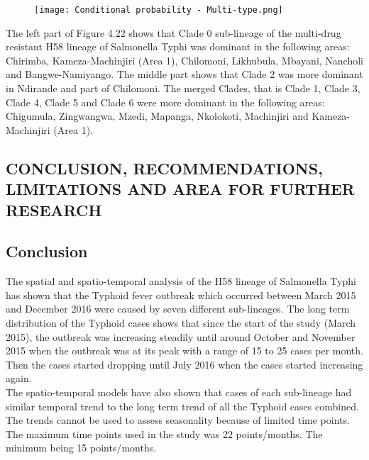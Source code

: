 \documentclass[a4paper]{thesis}
\begin{document}
\begin{figure}[H]
\begin{center}
\texttt{[image: Conditional probability - Multi-type.png]}
\end{center}
\end{figure}

The left part of Figure 4.22 shows that Clade 0 sub-lineage of the multi-drug resistant H58 lineage of Salmonella Typhi was dominant in the following areas: Chirimba, Kameza-Machinjiri (Area 1), Chilomoni, Likhubula, Mbayani, Nancholi and Bangwe-Namiyango. The middle part shows that Clade 2 was more dominant in Ndirande and part of Chilomoni. The merged Clades, that is Clade 1, Clade 3, Clade 4, Clade 5 and Clade 6 were more dominant in the following areas: Chigumula, Zingwangwa, Mzedi, Mapanga, Nkolokoti, Machinjiri and Kameza-Machinjiri (Area 1).

\begin{center}
\chapter{CONCLUSION, RECOMMENDATIONS, LIMITATIONS AND AREA FOR FURTHER RESEARCH}
\end{center} 

\section{Conclusion}

The spatial and spatio-temporal analysis of the H58 lineage of Salmonella Typhi has shown that the Typhoid fever outbreak which occurred between March 2015 and December 2016 were caused by seven different sub-lineages. The long term distribution of the Typhoid cases shows that since the start of the study (March 2015), the outbreak was increasing steadily until around October and November 2015 when the outbreak was at its peak with a range of 15 to 25 cases per month. Then the cases started dropping until July 2016 when the cases started increasing again.\\

The spatio-temporal models have also shown that cases of each sub-lineage had similar temporal trend to the long term trend of all the Typhoid cases combined. The trends cannot be used to assess seasonality because of limited time points. The maximum time points used in the study was 22 points/months. The minimum being 15 points/months.\\
\end{document}
